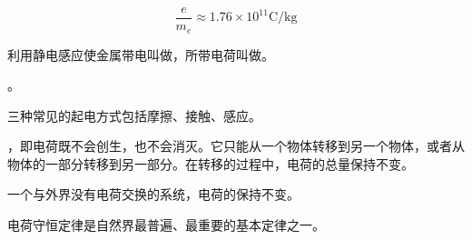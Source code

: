 {$$
\frac{e}{m_e}\approx1.76\times10^{11}\text{C}/\text{kg}
$$
\item 利用静电感应使金属带电叫做，所带电荷叫做。
\item {}。
\item 三种常见的起电方式包括摩擦、接触、感应。
\item {}，即电荷既不会创生，也不会消灭。它只能从一个物体转移到另一个物体，或者从物体的一部分转移到另一部分。在转移的过程中，电荷的总量保持不变。
\item 一个与外界没有电荷交换的系统，电荷的保持不变。
\item 电荷守恒定律是自然界最普遍、最重要的基本定律之一。
}
